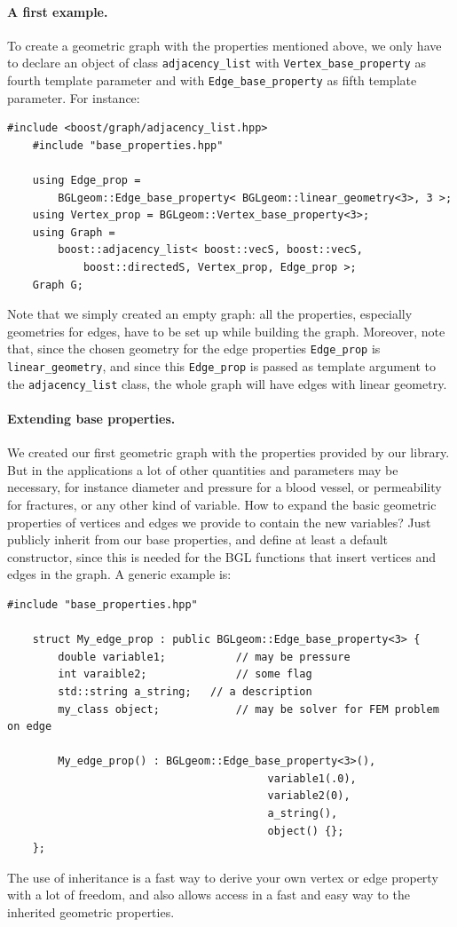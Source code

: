 \documentclass[10pt]{article} %
\newcommand{\classname}[1]{\texttt{#1}}
\begin{document}
	\paragraph{A first example.} To create a geometric graph with the properties mentioned above, we only have to declare an object of class \classname{adjacency\_list} with \classname{Vertex\_base\_property} as fourth template parameter and with \classname{Edge\_base\_property} as fifth template parameter. For instance:
	\begin{lstlisting}[frame=single]
	#include <boost/graph/adjacency_list.hpp>
	#include "base_properties.hpp"
	
	using Edge_prop = 
		BGLgeom::Edge_base_property< BGLgeom::linear_geometry<3>, 3 >;
	using Vertex_prop = BGLgeom::Vertex_base_property<3>;
	using Graph = 
		boost::adjacency_list< boost::vecS, boost::vecS, 
			boost::directedS, Vertex_prop, Edge_prop >;
	Graph G;
	\end{lstlisting}
	Note that we simply created an empty graph: all the properties, especially geometries for edges, have to be set up while building the graph. Moreover, note that, since the chosen geometry for the edge properties \texttt{Edge\_prop} is \texttt{linear\_geometry}, and since this \texttt{Edge\_prop} is passed as template argument to the \classname{adjacency\_list} class, the whole graph will have edges with linear geometry.
	\paragraph{Extending base properties.} We created our first geometric graph with the properties provided by our library. But in the applications a lot of other quantities and parameters may be necessary, for instance diameter and pressure for a blood vessel, or permeability for fractures, or any other kind of variable. How to expand the basic geometric properties of vertices and edges we provide to contain the new variables? Just publicly inherit from our base properties, and define at least a default constructor, since this is needed for the BGL functions that insert vertices and edges in the graph. A generic example is:
	\begin{lstlisting}[frame=single, name=create_graph]
	#include "base_properties.hpp"
	
	struct My_edge_prop : public BGLgeom::Edge_base_property<3> {
		double variable1;			// may be pressure
		int varaible2;				// some flag
		std::string a_string;	// a description
		my_class object;			// may be solver for FEM problem on edge
	
		My_edge_prop() : BGLgeom::Edge_base_property<3>(),
										 variable1(.0),
										 variable2(0),
										 a_string(),
										 object() {};	
	};
	\end{lstlisting}
	The use of inheritance is a fast way to derive your own vertex or edge property with a lot of freedom, and also allows access in a fast and easy way to the inherited geometric properties.
\end{document}
